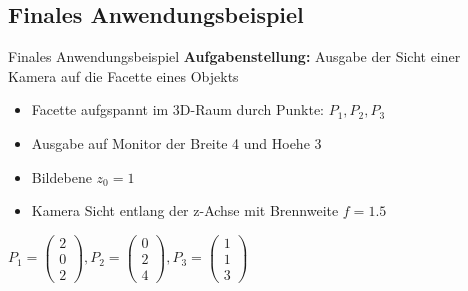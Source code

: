 \documentclass[10pt,aspectratio=169]{beamer}
\begin{document}
  \subsection{Finales Anwendungsbeispiel}
  \begin{frame}{Finales Anwendungsbeispiel}
    \textbf{Aufgabenstellung:} Ausgabe der Sicht einer Kamera auf die Facette eines Objekts
    \begin{itemize}
      \item Facette aufgspannt im 3D-Raum durch Punkte: $P_1, P_2, P_3$
      \item Ausgabe auf Monitor der Breite 4 und Hoehe 3
      \item Bildebene $z_0 = 1$
      \item Kamera Sicht entlang der z-Achse mit Brennweite $f=1.5$
    \end{itemize}
    \begin{center}
      $P_1 = \begin{pmatrix}
        2\\0\\2
      \end{pmatrix}, P_2 = \begin{pmatrix}
        0\\2\\4
      \end{pmatrix},
      P_3 = \begin{pmatrix}
        1\\1\\3
      \end{pmatrix}
      $
    \end{center}
  \end{frame}
\end{document}
